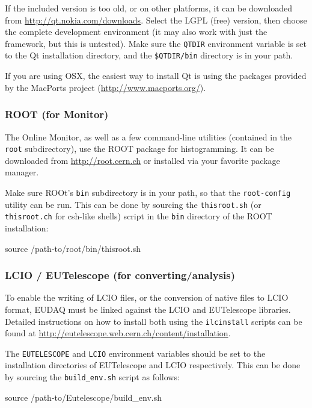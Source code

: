 If the included version is too old, or on other platforms,
it can be downloaded from \url{http://qt.nokia.com/downloads}.
Select the LGPL (free) version, then choose the complete development environment
(it may also work with just the framework, but this is untested).
Make sure the \texttt{QTDIR} environment variable is set to the Qt installation directory,
and the \texttt{\$QTDIR/bin} directory is in your path.

If you are using OSX, the easiest way to install Qt is using the
packages provided by the MacPorts project (\url{http://www.macports.org/}).

\subsubsection{ROOT (for Monitor)}
\label{sec:Root}
The Online Monitor, as well as a few command-line utilities (contained in the \texttt{root} subdirectory), use the ROOT package for histogramming.
It can be downloaded from \url{http://root.cern.ch} or installed via
your favorite package manager.

Make sure ROOt's \texttt{bin} subdirectory is in your path, so that the \texttt{root-config} utility can be run.
This can be done by sourcing the \texttt{thisroot.sh} (or \texttt{thisroot.ch} for csh-like shells)
script in the \texttt{bin} directory of the ROOT installation:
\begin{listing}[mybash]
source /path-to/root/bin/thisroot.sh
\end{listing}

\subsubsection{LCIO / EUTelescope (for converting/analysis)}
\label{sec:LCIO-EUTel}
To enable the writing of \gls{LCIO} files, or the conversion of native files to \gls{LCIO} format,
EUDAQ must be linked against the \gls{LCIO} and EUTelescope libraries.
Detailed instructions on how to install both using the
\texttt{ilcinstall} scripts can be found at \url{http://eutelescope.web.cern.ch/content/installation}.

The \texttt{EUTELESCOPE} and \texttt{LCIO} environment variables should be set to the
installation directories of EUTelescope and LCIO respectively.
This can be done by sourcing the \texttt{build\_env.sh} script as follows:
\begin{listing}[mybash]
source /path-to/Eutelescope/build_env.sh
\end{listing}


